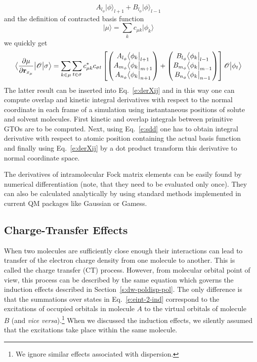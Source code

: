 \documentclass[b5paper,oneside,fleqn,11pt]{book}
\newcommand{\bra}[1]{\ensuremath{\bigl\langle {#1} \bigl\lvert}}
\newcommand{\ket}[1]{\ensuremath{\bigr\rvert {#1} \bigr\rangle}}
\newcommand{\tbraket}[3]{\ensuremath{\bigl\langle {#1} \bigl\lvert {#2} \bigl\lvert {#3} \bigr\rangle}}
\newcommand{\fderiv}[2]{\ensuremath{
    \frac{\partial #1}{\partial #2}}}
\begin{document}
\begin{refsection}
\begin{equation}
A_{l_\phi}  \ket{\phi}_{l+1} + B_{l_\phi}  \ket{\phi}_{l-1}
\end{equation}
%
and the definition of contracted basis function
%
\begin{equation}\label{e:muorb}
\ket{\mu} = \sum_k c_{\mu k} \ket{\phi_k}
\end{equation}
%
we quickly get
%
\begin{equation}\label{e:sdd}
\tbraket{\fderiv{\mu}{{\bf r}_{x_\mu}}}{ \mathscr{O} }{\sigma} =
\sum_{k\in\mu}\sum_{t\in\sigma}
c_{\mu k}^*c_{\sigma t}
  \left[
  \begin{pmatrix}
  A_{l_\phi} \bra{\phi_k}_{l+1} \\ 
  A_{m_\phi} \bra{\phi_k}_{m+1} \\ 
  A_{n_\phi} \bra{\phi_k}_{n+1}
  \end{pmatrix}
+
  \begin{pmatrix}
  B_{l_\phi} \bra{\phi_k}_{l-1} \\ 
  B_{m_\phi} \bra{\phi_k}_{m-1} \\ 
  B_{n_\phi} \bra{\phi_k}_{n-1}
  \end{pmatrix}
  \right]
\mathscr{O}\ket{\phi_t}
\end{equation}
%
The latter result can be inserted into Eq.~\eqref{e:derXij} and in this way
one can compute overlap and kinetic integral derivatives with respect to the normal coordinate
in each frame of a simulation using instantaneous positions of solute and solvent molecules.
First kinetic and overlap integrals between primitive GTOs are to be computed. Next,
using Eq.~\eqref{e:sdd} one has to obtain integral derivative with respect to atomic position
containing the actual basis function and finally using Eq.~\eqref{e:derXij} by a dot product
transform this derivative to normal coordinate space.

The derivatives of intramolecular Fock matrix elements can be easily found
by numerical  differentiation (note, that they need to be evaluated only once).
They can also be calculated analytically by using standard methods implemented
in current QM packages like {\sc Gaussian} or {\sc Gamess}.

\subsection{Charge-Transfer Effects\label{s:dw-ct}}

When two molecules are sufficiently close enough
their interactions can lead to transfer of the 
electron charge density from one molecule to another.
This is called the charge transfer (CT) process.
However, from molecular orbital point of view, this process can be 
described by the same equation which governs the induction
effects described in Section~\ref{s:dw-poldisp-pol}. The only difference
is that the summations over states in Eq.~\eqref{e:eint-2-ind} correspond to 
the excitations of occupied orbitals in molecule $A$ to
the virtual orbitals of molecule $B$ (and \emph{vice versa}).\footnote{We ignore similar effects
associated with dispersion.} 
When we discussed the induction effects, we silently assumed that
the excitations take place within the same molecule. 


\end{refsection}
\end{document}
